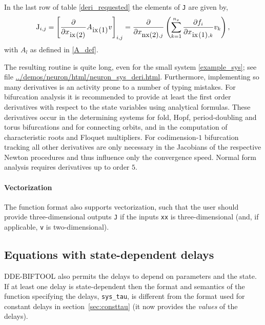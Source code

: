 \documentclass[10pt]{scrartcl}
\newcommand{\DDEBIFCODE}{\textsc{DDE-BIFTOOL}}
\newcommand{\blist}[1]{\mbox{\lstinline!#1!}}
\begin{document}
In the last row of table \ref{deri_requested} the elements of \blist{J}
are given by,
\[
\blist{J}_{i,j}=\left[\frac{\partial}{\partial x_{\blist{ix(2)}}}
A_{\blist{ix(1)}}v\right]_{i,j}
=\frac{\partial}{\partial x_{\blist{nx(2)},j}}
\left(\sum_{k=1}^{n_x}\frac{\partial f_i}{\partial x_{\blist{ix(1)},k}} v_k
\right),
\]
with $A_l$ as defined in \eqref{A_def}.


The resulting routine is quite long, even for the small system
\eqref{example_sys}; see file \url{../demos/neuron/html/neuron_sys_deri.html}.
Furthermore, implementing so many derivatives is an activity prone to
a number of typing mistakes. %
For bifurcation analysis it is recommended to provide
at least the first order derivatives with respect to the state
variables using analytical formulas. These derivatives occur in the
determining systems for fold, Hopf, period-doubling and torus bifurcations
and for connecting orbits,  
and in the computation of characteristic roots and Floquet
multipliers.  For codimension-$1$ bifurcation tracking all other
derivatives are only necessary in the Jacobians of the respective
Newton procedures and thus influence only the convergence
speed. Normal form analysis requires derivatives up to order $5$.

\paragraph{Vectorization} The function format also supports
vectorization, such that the user should provide three-dimensional
outputs \blist{J} if the inputs \blist{xx} is three-dimensional (and,
if applicable, \blist{v} is two-dimensional).

\subsection{Equations with state-dependent
  delays}\label{sys_def2}
\DDEBIFCODE{} also permits the delays to depend on parameters and the
state. If at least one delay is state-dependent then the format and
semantics of the function specifying the delays, \blist{sys_tau}, is
different from the format used for constant delays in
section~\ref{sec:consttau} (it now provides the \emph{values} of the
delays).
\end{document}
